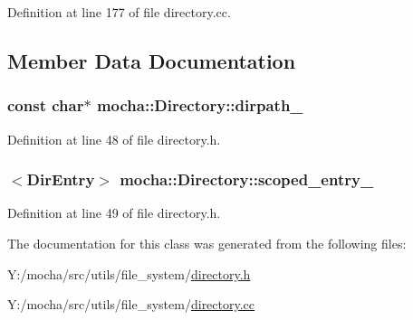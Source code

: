 Definition at line 177 of file directory.cc.



\subsection{Member Data Documentation}
\hypertarget{classmocha_1_1_directory_a3cd4008d4a33371aa4f56fc92b2e7917}{
\subsubsection[{dirpath\_\-}]{\setlength{\rightskip}{0pt plus 5cm}const char$\ast$ {\bf mocha::Directory::dirpath\_\-}}}
\label{classmocha_1_1_directory_a3cd4008d4a33371aa4f56fc92b2e7917}


Definition at line 48 of file directory.h.

\hypertarget{classmocha_1_1_directory_a6ca71b15d6b5344e0f999d877810d626}{
\subsubsection[{scoped\_\-entry\_\-}]{$<${\bf DirEntry}$>$ {\bf mocha::Directory::scoped\_\-entry\_\-}}}
\label{classmocha_1_1_directory_a6ca71b15d6b5344e0f999d877810d626}


Definition at line 49 of file directory.h.



The documentation for this class was generated from the following files:\begin{DoxyCompactItemize}
\item 
Y:/mocha/src/utils/file\_\-system/\hyperlink{directory_8h}{directory.h}\item 
Y:/mocha/src/utils/file\_\-system/\hyperlink{directory_8cc}{directory.cc}\end{DoxyCompactItemize}
